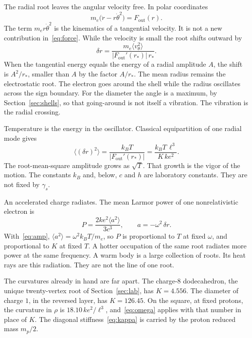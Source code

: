 \documentclass[a4paper]{article}
\begin{document}
The radial root leaves the angular velocity free. In polar coordinates
\begin{equation}
\label{eq:polar}
m_e\bigl(\ddot r-r\dot\theta^{2}\bigr)=F_{\mathrm{out}}(r).
\end{equation}
The term \(m_e r\dot\theta^{2}\) is the kinematics of a tangential velocity. It is not a new contribution in~\eqref{eq:force}. While the velocity is small the root shifts outward by
\begin{equation}
\label{eq:shift}
\delta r=\frac{m_e\langle v_{\theta}^{2}\rangle}{|F_{\mathrm{out}}'(r_*)|\,r_*}.
\end{equation}
When the tangential energy equals the energy of a radial amplitude \(A\), the shift is \(A^{2}/r_*\), smaller than \(A\) by the factor \(A/r_*\). The mean radius remains the electrostatic root. The electron goes around the shell while the radius oscillates across the sign boundary. For the diameter the angle is a maximum, by Section~\ref{sec:shells}, so that going-around is not itself a vibration. The vibration is the radial crossing.

Temperature is the energy in the oscillator. Classical equipartition of one radial mode gives
\begin{equation}
\label{eq:amp}
\langle(\delta r)^{2}\rangle
  =\frac{k_B T}{|F_{\mathrm{out}}'(r_*)|}
  =\frac{k_B T\,\ell^{3}}{K\,k e^{2}}.
\end{equation}
The root-mean-square amplitude grows as \(\sqrt{T}\). That growth is the vigor of the motion. The constants \(k_B\) and, below, \(c\) and \(h\) are laboratory constants. They are not fixed by \(\gamma_s\).

An accelerated charge radiates. The mean Larmor power of one nonrelativistic electron is
\begin{equation}
\label{eq:larmor}
P=\frac{2k e^{2}\langle a^{2}\rangle}{3c^{3}},
\qquad
a=-\omega^{2}\,\delta r.
\end{equation}
With~\eqref{eq:amp}, \(\langle a^{2}\rangle=\omega^{2} k_B T/m_e\), so \(P\) is proportional to \(T\) at fixed \(\omega\), and proportional to \(K\) at fixed \(T\). A hotter occupation of the same root radiates more power at the same frequency. A warm body is a large collection of roots. Its heat rays are this radiation. They are not the line of one root.

The curvatures already in hand are far apart. The charge-\(8\) dodecahedron, the unique twenty-vertex root of Section~\ref{sec:lab}, has \(K=4.556\). The diameter of charge \(1\), in the reversed layer, has \(K=126.45\). On the square, at fixed protons, the curvature in \(\rho\) is \(18.10\,k e^{2}/\ell^{3}\), and~\eqref{eq:omega} applies with that number in place of \(K\). The diagonal stiffness~\eqref{eq:kappa} is carried by the proton reduced mass \(m_p/2\).
\end{document}
